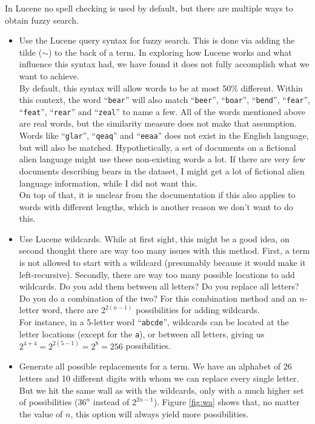 \documentclass[11pt]{article}
\begin{document}
In Lucene no spell checking is used by default, but there are multiple ways to obtain fuzzy search.
\begin{itemize}
    \item Use the Lucene query syntax for fuzzy search. This is done via adding the tilde ($\sim$) to the back of a term. In exploring how Lucene works and what influence this syntax had, we have found it does not fully accomplish what we want to achieve.\\
    By default, this syntax will allow words to be at most 50\% different. Within this context, the word ``\texttt{bear}'' will also match ``\texttt{beer}'', ``\texttt{boar}'', ``\texttt{bend}'', ``\texttt{fear}'', ``\texttt{feat}'', ``\texttt{rear}'' and ``\texttt{zeal}'' to name a few. All of the words mentioned above are real words, but the similarity measure does not make that assumption. Words like ``\texttt{glar}'', ``\texttt{qeaq}'' and ``\texttt{eeaa}'' does not exist in the English language, but will also be matched. Hypothetically, a set of documents on a fictional alien language might use these non-existing words a lot. If there are very few documents describing bears in the dataset, I might get a lot of fictional alien language information, while I did not want this.\\
    On top of that, it is unclear from the documentation if this also applies to words with different lengths, which is another reason we don't want to do this.
    \item Use Lucene wildcards. While at first sight, this might be a good idea, on second thought there are way too many issues with this method. First, a term is not allowed to start with a wildcard (presumably because it would make it left-recursive). Secondly, there are way too many possible locations to add wildcards. Do you add them between all letters? Do you replace all letters? Do you do a combination of the two? For this combination method and an $n$-letter word, there are $2^{2(n - 1)}$ possibilities for adding wildcards.\\
    For instance, in a 5-letter word ``\texttt{abcde}'', wildcards can be located at the letter locations (except for the \texttt{a}), or between all letters, giving us $2^{4+4} = 2^{2(5-1)} = 2^8 = 256$ possibilities.
    \item Generate all possible replacements for a term. We have an alphabet of 26 letters and 10 different digits with whom we can replace every single letter. But we hit the same wall as with the wildcards, only with a much higher set of possibilities ($36^{n}$ instead of $2^{2n-1}$). Figure \ref{fig:wa} shows that, no matter the value of $n$, this option will always yield more possibilities.

\end{itemize}
\end{document}
